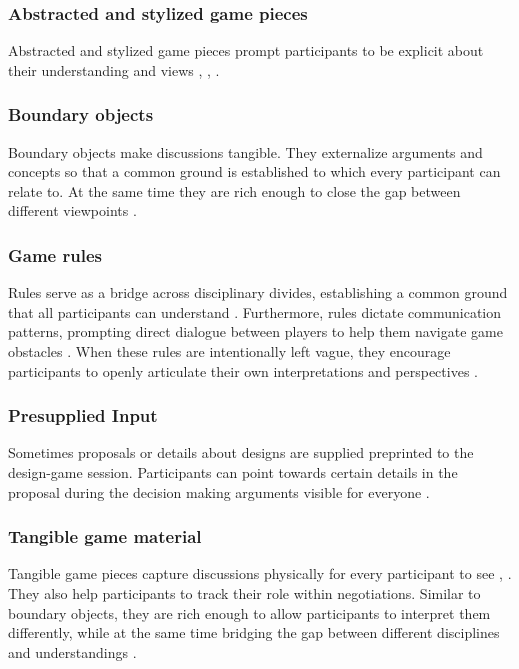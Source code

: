 \documentclass[draft,twoside]{vutinfth}
\begin{document}
            \subsubsection{Abstracted and stylized game pieces}
            Abstracted and stylized game pieces prompt participants to be explicit about their understanding and views 
            \cite{brandtDesigningExploratoryDesign2006}, \cite{vaajakallioDesignGamesCodesign2014}, \cite{kjaersgaardDesignGamesFieldwork2021}. 

            \subsubsection{Boundary objects}
            Boundary objects make discussions tangible. They externalize arguments and concepts so that a common ground is 
            established to which every participant can relate to. At the same time they are rich enough to close the gap 
            between different viewpoints \cite{brandtFacilitatingCollaborationDesign2004a}. 

            \subsubsection{Game rules}
            Rules serve as a bridge across disciplinary divides, establishing a common ground that all participants can understand 
            \cite{brandtDesigningExploratoryDesign2006}. Furthermore, rules dictate communication patterns, prompting direct dialogue 
            between players to help them navigate game obstacles \cite{zhangAddressingCulturalInertias2024}. When these rules are 
            intentionally left vague, they encourage participants to openly articulate their own interpretations and perspectives 
            \cite{brandtDesigningExploratoryDesign2006}.

            \subsubsection{Presupplied Input}
            Sometimes proposals or details about designs are supplied preprinted to the design-game session. Participants 
            can point towards certain details in the proposal during the decision making arguments visible for everyone \cite{eriksenTakingDesignGames2014}.

            \subsubsection{Tangible game material}
            Tangible game pieces capture discussions physically for every participant to see \cite{brandtDesigningExploratoryDesign2006}, \cite{eriksenTakingDesignGames2014}. 
            They also help participants to track their role within negotiations. Similar to boundary objects, they are rich enough to allow participants to 
            interpret them differently, while at the same time bridging the gap between different disciplines and understandings \cite{brandtFacilitatingCollaborationDesign2004a}. 
\end{document}
